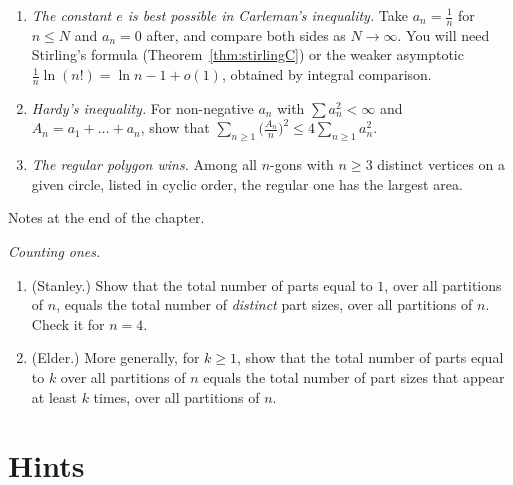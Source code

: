 \begin{challenge}
\begin{enumerate}[label=(\arabic*)]
\item \emph{The constant $e$ is best possible in Carleman's inequality.} Take $a_n=\frac1n$ for $n\le N$ and $a_n=0$ after, and compare both sides as $N\to\infty$. You will need Stirling's formula (Theorem~\ref{thm:stirlingC}) or the weaker asymptotic $\frac1n\ln(n!)=\ln n-1+o(1)$, obtained by integral comparison.
\item \emph{Hardy's inequality.} For non-negative $a_n$ with $\sum a_n^2<\infty$ and $A_n=a_1+\dots+a_n$, show that $\sum_{n\ge1}\bigl(\frac{A_n}n\bigr)^2\le4\sum_{n\ge1}a_n^2$.
\item \emph{The regular polygon wins.} Among all $n$-gons with $n\ge3$ distinct vertices on a given circle, listed in cyclic order, the regular one has the largest area.
\end{enumerate}
Notes at the end of the chapter.
\end{challenge}

\begin{exercise}[$\star\star$]\label{pb:stanley}
\emph{Counting ones.}
\begin{enumerate}[label=(\alph*)]
\item (Stanley.) Show that the total number of parts equal to $1$, over all partitions of $n$, equals the total number of
\emph{distinct} part sizes, over all partitions of $n$. Check it for $n=4$.
\item (Elder.) More generally, for $k\ge1$, show that the total number of parts equal to $k$ over all partitions of $n$ equals the
total number of part sizes that appear at least $k$ times, over all partitions of $n$.
\end{enumerate}
\end{exercise}

\section{Hints}

